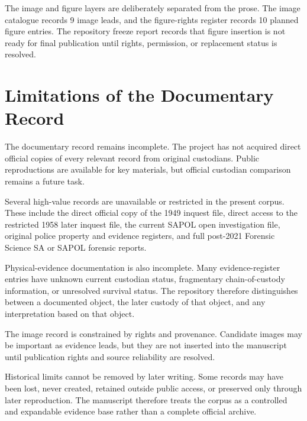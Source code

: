The image and figure layers are deliberately separated from the prose. The image catalogue records 9 image leads, and the figure-rights register records 10 planned figure entries. The repository freeze report records that figure insertion is not ready for final publication until rights, permission, or replacement status is resolved.

\section{Limitations of the Documentary Record}

The documentary record remains incomplete. The project has not acquired direct official copies of every relevant record from original custodians. Public reproductions are available for key materials, but official custodian comparison remains a future task.

Several high-value records are unavailable or restricted in the present corpus. These include the direct official copy of the 1949 inquest file, direct access to the restricted 1958 later inquest file, the current SAPOL open investigation file, original police property and evidence registers, and full post-2021 Forensic Science SA or SAPOL forensic reports.

Physical-evidence documentation is also incomplete. Many evidence-register entries have unknown current custodian status, fragmentary chain-of-custody information, or unresolved survival status. The repository therefore distinguishes between a documented object, the later custody of that object, and any interpretation based on that object.

The image record is constrained by rights and provenance. Candidate images may be important as evidence leads, but they are not inserted into the manuscript until publication rights and source reliability are resolved.

Historical limits cannot be removed by later writing. Some records may have been lost, never created, retained outside public access, or preserved only through later reproduction. The manuscript therefore treats the corpus as a controlled and expandable evidence base rather than a complete official archive.
